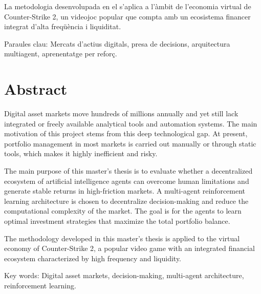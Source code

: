 La metodologia desenvolupada en el  s'aplica a l'àmbit de l'economia virtual de Counter-Strike 2, un videojoc popular que compta amb un ecosistema financer integrat d'alta freqüència i liquiditat.

Paraules clau: Mercats d'actius digitals, presa de decisions, arquitectura multiagent, aprenentatge per reforç.

\chapter*{Abstract}

Digital asset markets move hundreds of millions annually and yet still lack integrated or freely available analytical tools and automation systems. The main motivation of this project stems from this deep technological gap. At present, portfolio management in most markets is carried out manually or through static tools, which makes it highly inefficient and risky.

The main purpose of this master's thesis is to evaluate whether a decentralized ecosystem of artificial intelligence agents can overcome human limitations and generate stable returns in high-friction markets. A multi-agent reinforcement learning architecture is chosen to decentralize decision-making and reduce the computational complexity of the market. The goal is for the agents to learn optimal investment strategies that maximize the total portfolio balance.

The methodology developed in this master's thesis is applied to the virtual economy of Counter-Strike 2, a popular video game with an integrated financial ecosystem characterized by high frequency and liquidity.

Key words: Digital asset markets, decision-making, multi-agent architecture, reinforcement learning.
